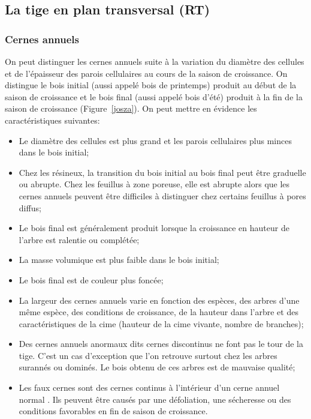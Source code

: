 \subsection{La tige en plan transversal (RT)}

\subsubsection{Cernes annuels}
 
On peut distinguer les cernes annuels suite à la variation du diamètre des cellules et de l'épaisseur des parois cellulaires au cours de la saison de croissance. On distingue le bois initial (aussi appelé bois de printemps) produit au début de la saison de croissance et le bois final (aussi appelé bois d'été) produit à la fin de la saison de croissance (Figure~\ref{josza}). On peut mettre en évidence les caractéristiques suivantes: 

\begin{itemize}
\item Le diamètre des cellules est plus grand et les parois cellulaires plus minces dans le bois initial; 
\item Chez les résineux, la transition du bois initial au bois final peut être graduelle ou abrupte. Chez les feuillus à zone poreuse, elle est abrupte alors que les cernes annuels peuvent être difficiles à distinguer chez certains feuillus à pores diffus; 
\item Le bois final est généralement produit lorsque la croissance en hauteur de l'arbre est ralentie ou complétée; 
\item La masse volumique est plus faible dans le bois initial; 
\item Le bois final est de couleur plus foncée; 
\item La largeur des cernes annuels varie en fonction des espèces, des arbres d'une même espèce, des conditions de croissance, de la hauteur dans l'arbre et des caractéristiques de la cime (hauteur de la cime vivante, nombre de branches); 
\item Des cernes annuels anormaux dits \og cernes discontinus \fg ne font pas le tour de la tige. C'est un cas d'exception que l'on retrouve surtout chez les arbres surannés ou dominés. Le bois obtenu de ces arbres est de mauvaise qualité; 
\item Les \og faux cernes \fg sont des cernes continus à l'intérieur d'un cerne annuel \og normal \fg. Ils peuvent être causés par une défoliation, une sécheresse ou des conditions favorables en fin de saison de croissance.  
\end{itemize}
 
